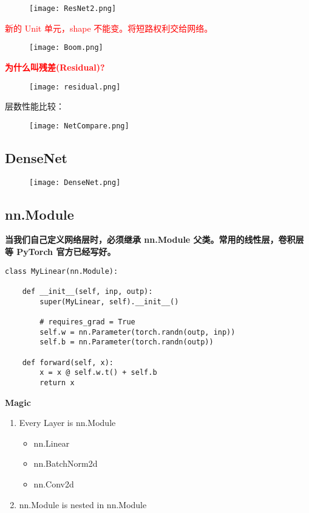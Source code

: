 \begin{figure}[!h]
  \centering
  \texttt{[image: ResNet2.png]}
\end{figure}

\textcolor{red}{新的 Unit 单元，shape 不能变。将短路权利交给网络。}

\begin{figure}[!h]
  \centering
  \texttt{[image: Boom.png]}
\end{figure}

\textbf{\textcolor{red}{为什么叫残差(Residual)?}}
\begin{figure}[!h]
  \centering
  \texttt{[image: residual.png]}
\end{figure}

层数性能比较：
\begin{figure}[!h]
  \centering
  \texttt{[image: NetCompare.png]}
\end{figure}

\newpage
\subsection{DenseNet}
\begin{figure}[!h]
  \centering
  \texttt{[image: DenseNet.png]}
\end{figure}

\subsection{nn.Module}
\textbf{当我们自己定义网络层时，必须继承 nn.Module 父类。常用的线性层，卷积层等 PyTorch 官方已经写好。}
\begin{lstlisting}
class MyLinear(nn.Module):

    def __init__(self, inp, outp):
        super(MyLinear, self).__init__()

        # requires_grad = True
        self.w = nn.Parameter(torch.randn(outp, inp))
        self.b = nn.Parameter(torch.randn(outp))

    def forward(self, x):
        x = x @ self.w.t() + self.b
        return x
\end{lstlisting}

\textbf{Magic}
\begin{enumerate}
  \item Every Layer is nn.Module
  \begin{itemize}
    \item nn.Linear
    \item nn.BatchNorm2d
    \item nn.Conv2d
  \end{itemize}
  \item nn.Module is nested in nn.Module
\end{enumerate}


